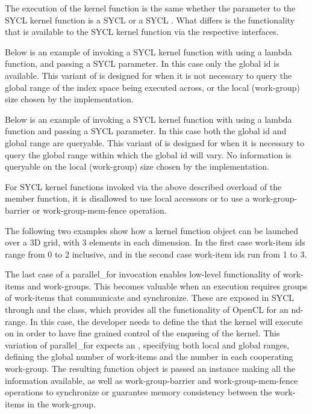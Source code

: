 The execution of the kernel function is the same whether the parameter to the SYCL kernel function is
a SYCL  or a SYCL .
What differs is the functionality that is available to the SYCL kernel function via the respective interfaces.

Below is an example of invoking a SYCL kernel function with  using a lambda function,
and passing a SYCL  parameter. In this case only the global id is available. This variant of
 is designed for when it is not necessary to query the global range of the index space
being executed across, or the local (work-group) size chosen by the implementation.


Below is an example of invoking a SYCL kernel function with  using a lambda function
and passing a SYCL  parameter. In this case both the global id and global range are queryable.
This variant of  is designed for when it is necessary to query the global range within
which the global id will vary.  No information is queryable on the local (work-group) size chosen by the
implementation.


For SYCL kernel functions invoked via the above described overload of the  member function,
it is disallowed to use local accessors or to use a \gls{work-group-barrier} or \gls{work-group-mem-fence} operation.

The following two examples show how a kernel function object can be launched
over a 3D grid, with 3 elements in each dimension. In the first case
work-item ids range from 0 to 2 inclusive, and in the second case
work-item ids run from 1 to 3.


The last case of a parallel_for invocation enables
low-level functionality of work-items and work-groups. This becomes
valuable when an execution requires groups of work-items that communicate and
synchronize. These are exposed in SYCL through 
and the  class, 
which provides all the functionality of OpenCL for an nd-range.
In this case, the developer needs to define the
  that the kernel will execute on in order to
 have fine grained  control of the enqueing of the kernel. 
 This variation of parallel_for expects an
 , specifying both local and global ranges,
 defining the global
 number of work-items and the number in each cooperating work-group.
 The resulting function object is passed an 
 instance making all the information available, as well as
 \gls{work-group-barrier} and \gls{work-group-mem-fence} operations
 to synchronize or guarantee memory consistency between the \gls{work-item}s in the \gls{work-group}.

